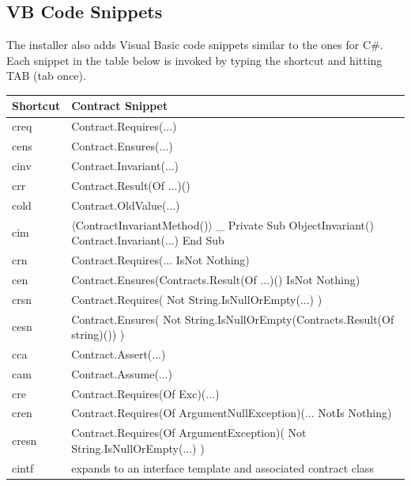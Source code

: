 \documentclass{article}
\newcommand{\csharp}{C\#}
\begin{document}
\subsection{VB Code Snippets}

The installer also adds Visual Basic code snippets similar to the ones for \csharp{}.
Each snippet in the table below is
invoked by typing the shortcut and hitting TAB (tab once).
\begin{center}
\codefamily
\begin{tabular}{|l|l|}
\hline
Shortcut & Contract Snippet \\
\hline
\hline
creq & Contract.Requires(...)
\\
\hline
cens & Contract.Ensures(...)
\\
\hline
cinv & Contract.Invariant(...)
\\
\hline
crr & Contract.Result(Of ...)()
\\
\hline
cold & Contract.OldValue(...)
\\
\hline
cim & \multicolumn{1}{p{6cm}|}{
\raggedright
$\langle$ContractInvariantMethod()$\rangle$ \_\linebreak
Private Sub ObjectInvariant() \linebreak
\hspace*{5mm} Contract.Invariant(...) \linebreak
End Sub}
\\
\hline
crn & Contract.Requires(... IsNot Nothing)
\\
\hline
cen & Contract.Ensures(Contracts.Result(Of ...)() IsNot Nothing)
\\
\hline
crsn & Contract.Requires( Not String.IsNullOrEmpty(...) )
\\
\hline
cesn & Contract.Ensures( Not String.IsNullOrEmpty(Contracts.Result(Of string)()) )
\\
\hline
cca & Contract.Assert(...)
\\
\hline
cam & Contract.Assume(...)
\\
\hline
cre & Contract.Requires(Of Exc)(...)
\\
\hline
cren & Contract.Requires(Of ArgumentNullException)(... NotIs Nothing)
\\
\hline
cresn & Contract.Requires(Of ArgumentException)( Not String.IsNullOrEmpty(...) )
\\
\hline
cintf & expands to an interface template and associated contract class
\\
\hline
\end{tabular}
\end{center}
\end{document}
